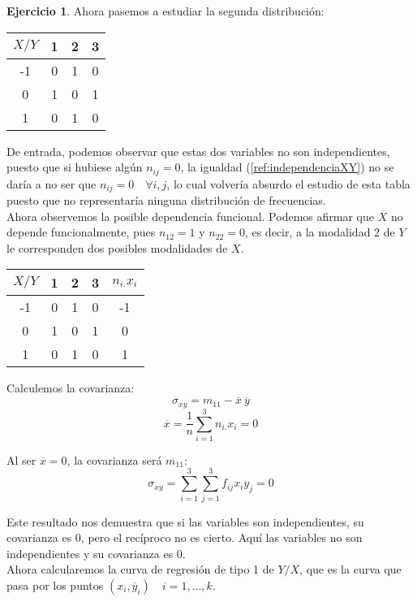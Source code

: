 \documentclass[a4paper, 12pt]{article}
\theoremstyle{definition}
\newtheorem{ej}{Ejercicio}
\begin{document}
\begin{ej}
Ahora pasemos a estudiar la segunda distribución:
\begin{center}
\begin{tabular}{c|ccc}
	\(X/Y\) & 1 & 2 & 3 \\
	\hline
	-1 & 0 & 1 & 0 \\
	0 & 1 & 0 & 1 \\
	1 & 0 & 1 & 0
\end{tabular}
\end{center}

De entrada, podemos observar que estas dos variables no son independientes, puesto que si hubiese algún \(n_{ij} = 0\), la igualdad (\ref{ref:independenciaXY}) no se daría a no ser que \(n_{ij} = 0 \quad \forall i,j\), lo cual volvería absurdo el estudio de esta tabla puesto que no representaría ninguna distribución de frecuencias. \\

Ahora observemos la posible dependencia funcional. Podemos afirmar que \(X\) no depende funcionalmente, pues \(n_{12} = 1\) y \(n_{22} = 0\), es decir, a la modalidad 2 de \(Y\) le corresponden dos posibles modalidades de \(X\). \\

\begin{center}
\begin{tabular}{c|cccc}
	\(X/Y\) & 1 & 2 & 3 & \(n_{i.} x_i\) \\
	\hline
	-1 & 0 & 1 & 0 & -1 \\
	0 & 1 & 0 & 1 & 0 \\
	1 & 0 & 1 & 0 & 1
\end{tabular}
\end{center}

Calculemos la covarianza:
\[
	\sigma_{xy} = m_{11} - \overline{x}\ \overline{y}
\]
\[
	\overline{x} = \frac{1}{n} \sum_{i=1}^{3} n_{i.} x_i = 0
\]

Al ser \(\overline{x} = 0\), la covarianza será \(m_{11}\):
\[
	\sigma_{xy} = \sum_{i=1}^{3} \sum_{j=1}^{3} f_{ij} x_i y_j = 0
\]

Este resultado nos demuestra que si las variables son independientes, su covarianza es 0, pero el recíproco no es cierto. Aquí las variables no son independientes y su covarianza es 0. \\

Ahora calcularemos la curva de regresión de tipo 1 de \(Y/X\), que es la curva que pasa por los puntos \((x_i, \overline{y}_i) \quad i=1, \dotsc, k\). \\


\end{ej}
\end{document}
